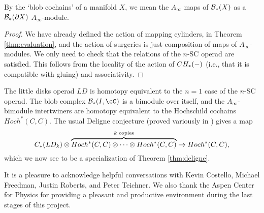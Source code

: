 \documentclass{pnastwo}
\begin{document}
\begin{article}
By the `blob cochains' of a manifold $X$, we mean the $A_\infty$ maps of ${\mathcal B}_*(X)$ as a ${\mathcal B}_*(\partial X)$ $A_\infty$-module.

\begin{proof}
We have already defined the action of mapping cylinders, in Theorem \ref{thm:evaluation}, 
and the action of surgeries is just composition of maps of $A_\infty$-modules. 
We only need to check that the relations of the $n$-SC operad are satisfied. 
This follows from the locality of the action of $CH_*(-)$ (i.e., that it is compatible with gluing) and associativity.
\end{proof} 

The little disks operad $LD$ is homotopy equivalent to 
the $n=1$ case of the $n$-SC operad. The blob complex $\bc_*(I, \cC)$ is a bimodule over itself, and the $A_\infty$-bimodule intertwiners are homotopy equivalent to the Hochschild cochains $Hoch^*(C, C)$. 
The usual Deligne conjecture (proved variously in \cite{hep-th/9403055, MR1805894, MR2064592, MR1805923}) 
gives a map
\[
	C_*(LD_k)\otimes \overbrace{Hoch^*(C, C)\otimes\cdots\otimes Hoch^*(C, C)}^{\text{$k$ copies}}
			\to  Hoch^*(C, C),
\]
which we now see to be a specialization of Theorem \ref{thm:deligne}.







\begin{acknowledgments}
It is a pleasure to acknowledge helpful conversations with 
Kevin Costello,
Michael Freedman,
Justin Roberts,
and
Peter Teichner.
We also thank the Aspen Center for Physics for providing a pleasant and productive
environment during the last stages of this project.
\end{acknowledgments}



\end{article}
\end{document}
